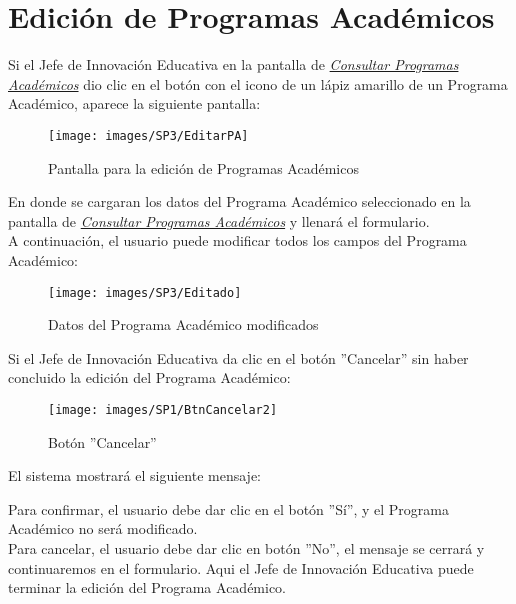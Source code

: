 \newpage
    \section{Edición de Programas Académicos}
        Si el Jefe de Innovación Educativa en la pantalla de \hyperlink{consultarpa}{\textit{Consultar Programas Académicos}} dio clic en el botón con el icono de un lápiz amarillo de un Programa Académico, aparece la siguiente pantalla:
        
        \begin{figure}[!hbtp]
        	\centering
        	\hypertarget{editarpa}{\texttt{[image: images/SP3/EditarPA]}}
        	\caption{Pantalla para la edición de Programas Académicos}
        	\label{editarpa}
        \end{figure}

        En donde se cargaran los datos del Programa Académico seleccionado en la pantalla de \hyperlink{consultarpa}{\textit{Consultar Programas Académicos}} y llenará el formulario.\\
        
        A continuación, el usuario puede modificar todos los campos del Programa Académico:
        \begin{figure}[!hbtp]
        	\centering
        	\hypertarget{modif}{\texttt{[image: images/SP3/Editado]}}
        	\caption{Datos del Programa Académico modificados}
        	\label{modif}
        \end{figure}

        Si el Jefe de Innovación Educativa da clic en el botón ''Cancelar'' sin haber concluido la edición del Programa Académico:
        
        \begin{figure}[!hbtp]
        	\centering
        	\hypertarget{cancel2}{\texttt{[image: images/SP1/BtnCancelar2]}}
        	\caption{Botón ''Cancelar''}
        	\label{cancel2}
        \end{figure}
        
        El sistema mostrará el siguiente mensaje:
        
        Para confirmar, el usuario debe dar clic en el botón ''Sí'', y el Programa Académico no será modificado.\\
        
        Para cancelar, el usuario debe dar clic en botón ''No'', el mensaje se cerrará y continuaremos en el formulario. Aqui el Jefe de Innovación Educativa puede terminar la edición del Programa Académico.\\

